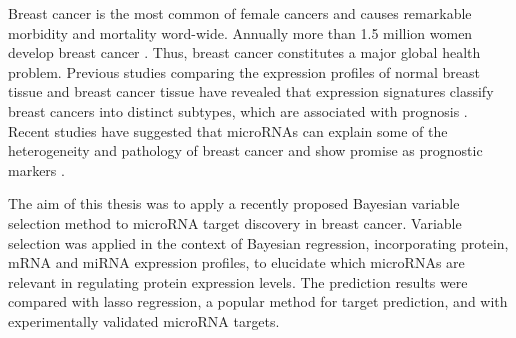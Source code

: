 Breast cancer is the most common of female cancers and causes remarkable
morbidity and mortality word-wide. Annually more than 1.5 million women
develop breast cancer \citep{Ferlay2015}. Thus, breast cancer constitutes a
major global health problem. Previous studies comparing the expression
profiles of normal breast tissue and breast cancer tissue have revealed that
expression signatures classify breast cancers into distinct subtypes, which
are associated with prognosis \citep{Sorlie2001}. Recent studies have
suggested that microRNAs can explain some of the heterogeneity and pathology
of breast cancer and show promise as prognostic markers
\citep{vanSchooneveld2015}.

The aim of this thesis was to apply a recently proposed Bayesian variable
selection method to microRNA target discovery in breast cancer. Variable
selection was applied in the context of Bayesian regression, incorporating protein, mRNA
and miRNA expression profiles, to elucidate which microRNAs are
relevant in regulating protein expression levels. The prediction results were
compared with lasso regression, a popular method for target prediction, and
with experimentally validated microRNA targets.
